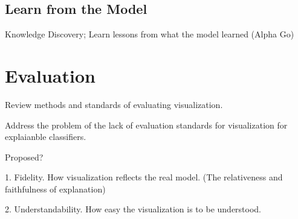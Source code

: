 \subsection{Learn from the Model} 
Knowledge Discovery; Learn lessons from what the model learned (Alpha Go)

\section{Evaluation}

Review methods and standards of evaluating visualization.

Address the problem of the lack of evaluation standards for visualization for explaianble classifiers.

Proposed?

1. Fidelity. How visualization reflects the real model. (The relativeness and faithfulness of explanation)

2. Understandability. How easy the visualization is to be understood.

\newpage

